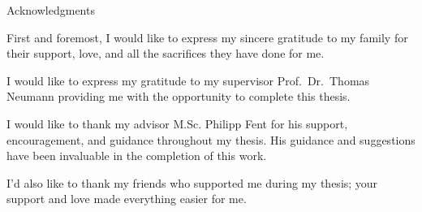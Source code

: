 \thispagestyle{empty}

\vspace*{20mm}

\begin{center}
{ Acknowledgments}
\end{center}

\vspace{10mm}

First and foremost, I would like to express my sincere gratitude to my family for their support, love, and all the sacrifices they have done for me.

I would like to express my gratitude to my supervisor Prof.\ Dr.\ Thomas Neumann providing me with the opportunity to complete this thesis.

I would like to thank my advisor M.Sc. Philipp Fent for his support, encouragement, and guidance throughout my thesis. His guidance and suggestions have been invaluable in the completion of this work.

I’d also like to thank my friends who supported me during my thesis; your support and love made everything easier for me.
\cleardoublepage{}
